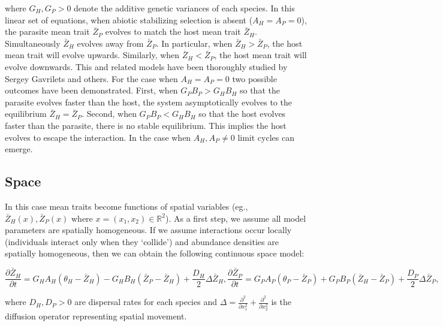 \documentclass{article}
\begin{document}
where \(G_H,G_P>0\) denote the additive genetic variances of each
species. In this linear set of equations, when abiotic stabilizing
selection is absent (\(A_H=A_P=0\)), the parasite mean trait
\(\bar Z_P\) evolves to match the host mean trait \(\bar Z_H\).
Simultaneously \(\bar Z_H\) evolves away from \(\bar Z_P\). In
particular, when \(\bar Z_H>\bar Z_P\), the host mean trait will evolve
upwards. Similarly, when \(\bar Z_H<\bar Z_P\), the host mean trait will
evolve downwards. This and related models have been thoroughly studied
by Sergey Gavrilets and others. For the case when \(A_H=A_P=0\) two
possible outcomes have been demonstrated. First, when \(G_PB_P>G_HB_H\)
so that the parasite evolves faster than the host, the system
asymptotically evolves to the equilibrium \(\bar Z_H=\bar Z_P\). Second,
when \(G_PB_P<G_HB_H\) so that the host evolves faster than the
parasite, there is no stable equilibrium. This implies the host evolves
to escape the interaction. In the case when \(A_H,A_P\neq0\) limit
cycles can emerge.

\hypertarget{space}{%
\subsection{Space}\label{space}}

In this case mean traits become functions of spatial variables (eg.,
\(\bar Z_H(x),\bar Z_P(x)\) where \(x=(x_1,x_2)\in\mathbb R^2\)). As a
first step, we assume all model parameters are spatially homogeneous. If
we assume interactions occur locally (individuals interact only when
they `collide') and abundance densities are spatially homogeneous, then
we can obtain the following continuous space model:

\begin{subequations}\label{deterministic}
  \begin{equation}
    \frac{\partial\bar Z_H}{\partial t}=G_HA_H(\theta_H-\bar Z_H)-G_HB_H(\bar Z_P-\bar Z_H)+\frac{D_H}{2}\Delta\bar Z_H,
  \end{equation}
  \begin{equation}
    \frac{\partial\bar Z_P}{\partial t}=G_PA_P(\theta_P-\bar Z_P)+G_PB_P(\bar Z_H-\bar Z_P)+\frac{D_P}{2}\Delta\bar Z_P,
  \end{equation}
\end{subequations}

where \(D_H,D_P>0\) are dispersal rates for each species and
\(\Delta=\frac{\partial^2}{\partial x_1^2}+\frac{\partial^2}{\partial x_2^2}\)
is the diffusion operator representing spatial movement.
\end{document}
